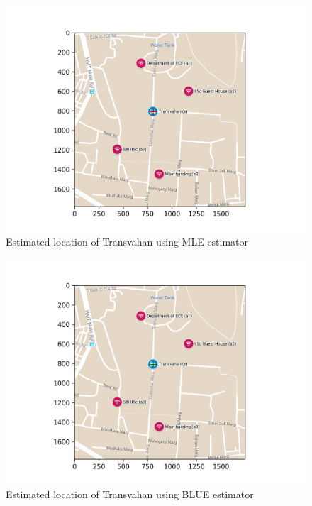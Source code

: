 \documentclass[a4 paper]{article}
\begin{document}
\vspace{6em}

\begin{figure}[h]
	\includegraphics[width=\linewidth]{../results/MLE_map_loc.png}
	\caption{Estimated location of Transvahan using MLE estimator}
	\label{fig:MLE}
\end{figure}





\newpage
{}

\vspace{6em}

\begin{figure}[h]
	\includegraphics[width=\linewidth]{../results/BLUE_map_loc.png}
	\caption{Estimated location of Transvahan using BLUE estimator}
	\label{fig:BLUE}
\end{figure}
\end{document}
